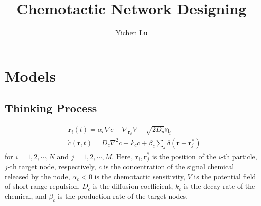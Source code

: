\documentclass{article}
\title{\textbf{Chemotactic Network Designing}}
\author{Yichen Lu}
\begin{document}
\maketitle

\tableofcontents

\newpage
\section{Models}

\subsection{Thinking Process}

\begin{subequations}
    \begin{align}
        &\dot{\mathbf{r}}_i\left( t \right) =\alpha_c \nabla c-\nabla _{\mathbf{r}_i}V+\sqrt{2D_p}\mathbf{\eta }_i\\
        &\dot{c}\left( \mathbf{r},t \right) =D_c\nabla ^2c-k_cc+\beta _c\sum\nolimits_j^{}{\delta \left( \mathbf{r}-\mathbf{r}_{j}^{*} \right)}
    \end{align}
\end{subequations}
for $i=1,2,\cdots,N$ and $j=1,2,\cdots,M$. Here, $\mathbf{r}_i, \mathbf{r}_j^*$ is the position of the $i$-th particle, $j$-th target node, respectively, $c$ is the concentration of the signal chemical released by the node, $\alpha _c<0$ is the chemotactic sensitivity, $V$ is the potential field of short-range repulsion, $D_c$ is the diffusion coefficient, $k_c$ is the decay rate of the chemical, and $\beta _c$ is the production rate of the target nodes. 
\end{document}
